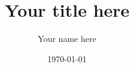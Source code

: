 \documentclass{if-beamer}
\title{Your title here}
\author{Your name here}
\institute[U. Oklahoma]{University of Oklahoma}
\date{\today}
\begin{document}
    \begin{frame}
        \titlepage
    \end{frame}

    



    
\end{document}

